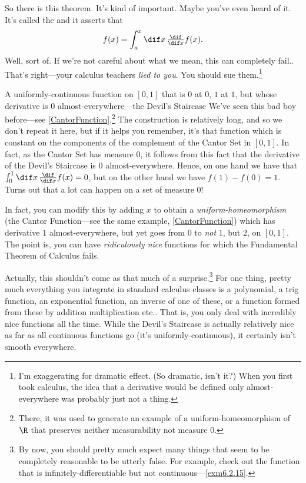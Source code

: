 So there is this theorem.  It's kind of important.  Maybe you've even heard of it.  It's called the  and it asserts that
\begin{equation}
f(x)=\int _a^x\dif x\, \tfrac{\dif}{\dif x}f(x).
\end{equation}
Well, sort of.  If we're not careful about what we mean, this can completely fail..  That's right---your calculus teachers \emph{lied to you}.  You should sue them.\footnote{I'm exaggerating for dramatic effect.  (So dramatic, isn't it?)  When you first took calculus, the idea that a derivative would be defined only almost-everywhere was probably just not a thing.}
\begin{exm}{A uniformly-continuous function on {$[0,1]$} that is $0$ at $0$, $1$ at $1$, but whose derivative is $0$ almost-everywhere---the Devil's Staircase}{}
We've seen this bad boy before---see \cref{CantorFunction}.\footnote{There, it was used to generate an example of a uniform-homeomorphism of $\R$ that preserves neither measurability not measure $0$.}  The construction is relatively long, and so we don't repeat it here, but if it helps you remember, it's that function which is constant on the components of the complement of the Cantor Set in $[0,1]$.  In fact, as the Cantor Set has measure $0$, it follows from this fact that the derivative of the Devil's Staircase is $0$ almost-everywhere.  Hence, on one hand we have that $\int _0^1\dif x\, \frac{\dif}{\dif x}f(x)=0$, but on the other hand we have $f(1)-f(0)=1$.  Turns out that a lot can happen on a set of measure $0$!

In fact, you can modify this by adding $x$ to obtain a \emph{uniform-homeomorphism} (the Cantor Function---see the same example, \cref{CantorFunction}) which has derivative $1$ almost-everywhere, but yet goes from $0$ to \emph{not} $1$, but $2$, on $[0,1]$.  The point is, you can have \emph{ridiculously nice} functions for which the Fundamental Theorem of Calculus fails.
\end{exm}
Actually, this shouldn't come as that much of a surprise.\footnote{By now, you should pretty much expect many things that seem to be completely reasonable to be utterly false.  For example, check out the function that is infinitely-differentiable but not continuous---\cref{exm6.2.15}.}  For one thing, pretty much everything you integrate in standard calculus classes is a polynomial, a trig function, an exponential function, an inverse of one of these, or a function formed from these by addition multiplication etc..  That is, you only deal with incredibly nice functions all the time.  While the Devil's Staircase is actually relatively nice as far as all continuous functions go (it's uniformly-continuous), it certainly isn't smooth everywhere.

